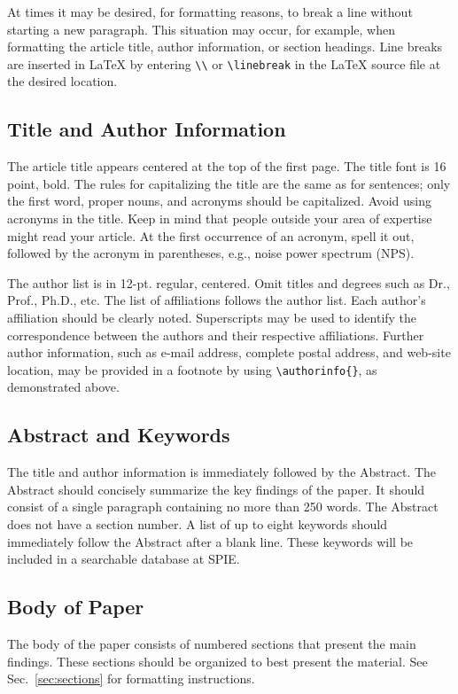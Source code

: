 At times it may be desired, for formatting reasons, to break a line without starting a new paragraph.  This situation may occur, for example, when formatting the article title, author information, or section headings.  Line breaks are inserted in LaTeX by entering \verb|\\| or \verb|\linebreak| in the LaTeX source file at the desired location.

\subsection{Title and Author Information}
\label{sec:title}

The article title appears centered at the top of the first page.  The title font is 16 point, bold.  The rules for capitalizing the title are the same as for sentences; only the first word, proper nouns, and acronyms should be capitalized.  Avoid using acronyms in the title.  Keep in mind that people outside your area of expertise might read your article. At the first occurrence of an acronym, spell it out, followed by the acronym in parentheses, e.g., noise power spectrum (NPS).

The author list is in 12-pt. regular, centered. Omit titles and degrees such as Dr., Prof., Ph.D., etc. The list of affiliations follows the author list. Each author's affiliation should be clearly noted. Superscripts may be used to identify the correspondence between the authors and their respective affiliations.  Further author information, such as e-mail address, complete postal address, and web-site location, may be provided in a footnote by using \verb|\authorinfo{}|, as demonstrated above.

\subsection{Abstract and Keywords}
The title and author information is immediately followed by the Abstract. The Abstract should concisely summarize the key findings of the paper.  It should consist of a single paragraph containing no more than 250 words.  The Abstract does not have a section number.  A list of up to eight keywords should immediately follow the Abstract after a blank line.  These keywords will be included in a searchable database at SPIE.

\subsection{Body of Paper}
The body of the paper consists of numbered sections that present the main findings.  These sections should be organized to best present the material.  See Sec.~\ref{sec:sections} for formatting instructions.

